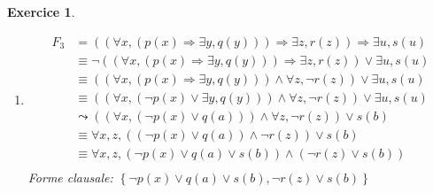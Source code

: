 \documentclass{article}
\theoremstyle{plain}
\newtheorem{exo}{Exercice}%
\begin{document}
\begin{exo}
\begin{enumerate}
    \item \begin{align*}
        F_3 &= ((\forall x, (p(x) \Rightarrow \exists y, q(y))) \Rightarrow \exists z, r(z)) 
                \Rightarrow \exists u, s(u) \\
            &\equiv \neg ((\forall x, (p(x) \Rightarrow \exists y, q(y))) \Rightarrow 
                \exists z, r(z)) \vee \exists u, s(u) \\
            &\equiv ((\forall x, (p(x) \Rightarrow \exists y, q(y))) \wedge 
                \forall z, \neg r(z)) \vee \exists u, s(u) \\
            &\equiv ((\forall x, (\neg p(x) \vee \exists y, q(y))) \wedge
                \forall z, \neg r(z)) \vee \exists u, s(u) \\
            &\leadsto ((\forall x, (\neg p(x) \vee q(a))) \wedge
                \forall z, \neg r(z)) \vee s(b) \\
            &\equiv \forall x, z, ((\neg p(x) \vee q(a)) \wedge
                \neg r(z)) \vee s(b) \\
            &\equiv \forall x, z, (\neg p(x) \vee q(a) \vee s(b)) \wedge
                (\neg r(z) \vee s(b)) \\
    \end{align*}
    Forme clausale: $\left\{\neg p(x) \vee q(a) \vee s(b), \neg r(z) \vee s(b) \right\}$
\end{enumerate}
\end{exo}
\end{document}
